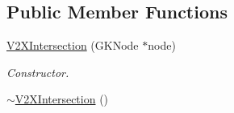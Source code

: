 \subsection*{Public Member Functions}
\begin{DoxyCompactItemize}
\item 
\hyperlink{classV2XIntersection_ad291a1e4929b43ffad219dd26868534c}{V2\+X\+Intersection} (G\+K\+Node $\ast$node)
\begin{DoxyCompactList}\small\item\em Constructor. \end{DoxyCompactList}\item 
\hyperlink{classV2XIntersection_afaf5658f1e2ab9c191535441a4959fc1}{$\sim$\+V2\+X\+Intersection} ()\hypertarget{classV2XIntersection_afaf5658f1e2ab9c191535441a4959fc1}{}\label{classV2XIntersection_afaf5658f1e2ab9c191535441a4959fc1}


\end{DoxyCompactItemize}
